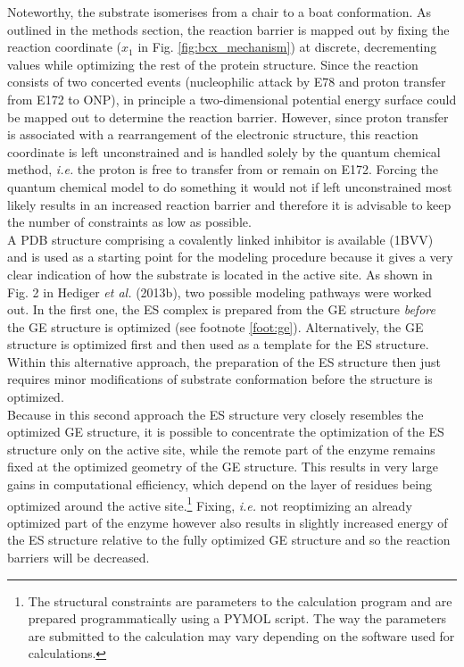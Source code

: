 Noteworthy, the substrate isomerises from a chair to a boat conformation.
As outlined in the methods section, the reaction barrier is mapped out by fixing the reaction coordinate ($x_1$ in Fig. \ref{fig:bcx_mechanism}) at discrete, decrementing values while optimizing the rest of the protein structure.
Since the reaction consists of two concerted events (nucleophilic attack by E78 and proton transfer from E172 to ONP), in principle a two-dimensional potential energy surface could be mapped out to determine the reaction barrier.
However, since proton transfer is associated with a rearrangement of the electronic structure, this reaction coordinate is left unconstrained and is handled solely by the quantum chemical method, \textit{i.e.} the proton is free to transfer from or remain on E172.
Forcing the quantum chemical model to do something it would not if left unconstrained most likely results in an increased reaction barrier and therefore it is advisable to keep the number of constraints as low as possible.\\
A PDB structure comprising a covalently linked inhibitor is available (1BVV) and is used as a starting point for the modeling procedure because it gives a very clear indication of how the substrate is located in the active site.
As shown in Fig. 2 in Hediger \textit{et al.} (2013b), two possible modeling pathways were worked out.
In the first one, the ES complex is prepared from the GE structure \textit{before} the GE structure is optimized (see footnote \ref{foot:ge}).
Alternatively, the GE structure is optimized first and then used as a template for the ES structure.
Within this alternative approach, the preparation of the ES structure then just requires minor modifications of substrate conformation before the structure is optimized.\\
Because in this second approach the ES structure very closely resembles the optimized GE structure, it is possible to concentrate the optimization of the ES structure only on the active site, while the remote part of the enzyme remains fixed at the optimized geometry of the GE structure.
This results in very large gains in computational efficiency, which depend on the layer of residues being optimized around the active site.\footnote{The structural constraints are parameters to the calculation program and are prepared programmatically using a PYMOL script. The way the parameters are submitted to the calculation may vary depending on the software used for calculations.}
Fixing, \textit{i.e.} not reoptimizing an already optimized part of the enzyme however also results in slightly increased energy of the ES structure relative to the fully optimized GE structure and so the reaction barriers will be decreased.
